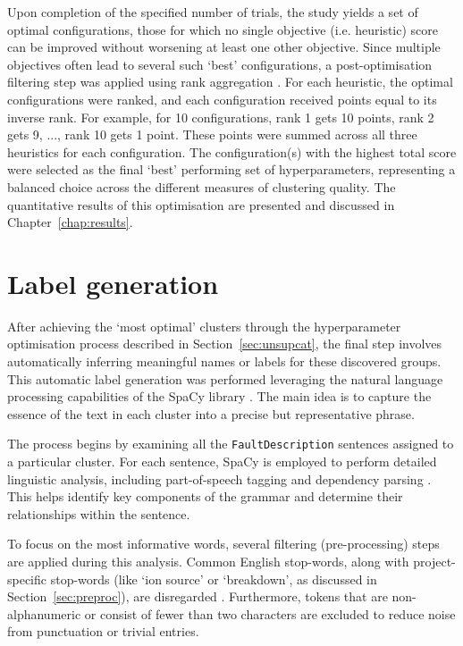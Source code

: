 \documentclass[10pt,oneside]{report}
\begin{document}
Upon completion of the specified number of trials, the study yields a set of optimal configurations, those for which no single objective (i.e. heuristic) score can be improved without worsening at least one other objective. Since multiple objectives often lead to several such `best' configurations, a post-optimisation filtering step was applied using rank aggregation \cite{li2019comparative}. For each heuristic, the optimal configurations were ranked, and each configuration received points equal to its inverse rank. For example, for 10 configurations, rank 1 gets 10 points, rank 2 gets 9, ..., rank 10 gets 1 point. These points were summed across all three heuristics for each configuration. The configuration(s) with the highest total score were selected as the final `best' performing set of hyperparameters, representing a balanced choice across the different measures of clustering quality. The quantitative results of this optimisation are presented and discussed in Chapter~\ref{chap:results}.

\section{Label generation}\label{sec:labelgen}

After achieving the `most optimal’ clusters through the hyperparameter optimisation process described in Section~\ref{sec:unsupcat}, the final step involves automatically inferring meaningful names or labels for these discovered groups. This automatic label generation was performed leveraging the natural language processing capabilities of the SpaCy library \cite{spacy2}. The main idea is to capture the essence of the text in each cluster into a precise but representative phrase.

The process begins by examining all the \texttt{FaultDescription} sentences assigned to a particular cluster. For each sentence, SpaCy is employed to perform detailed linguistic analysis, including part-of-speech tagging and dependency parsing \cite{tabassum2020survey}. This helps identify key components of the grammar and determine their relationships within the sentence.

To focus on the most informative words, several filtering (pre-processing) steps are applied during this analysis. Common English stop-words, along with project-specific stop-words (like `ion source' or `breakdown', as discussed in Section~\ref{sec:preproc}), are disregarded \cite{tabassum2020survey}. Furthermore, tokens that are non-alphanumeric or consist of fewer than two characters are excluded to reduce noise from punctuation or trivial entries.
\end{document}
